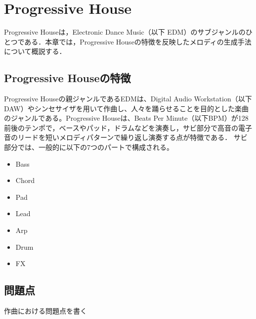 \chapter{Progressive House}
Progressive Houseは，Electronic Dance Music（以下 EDM）のサブジャンルのひとつである．本章では，Progressive Houseの特徴を反映したメロディの生成手法について概説する．

\section{Progressive Houseの特徴}
Progressive Houseの親ジャンルであるEDMは、Digital Audio Workstation（以下 DAW）やシンセサイザを用いて作曲し、人々を踊らせることを目的とした楽曲のジャンルである。Progressive Houseは、Beats Per Minute（以下BPM）が128前後のテンポで，ベースやパッド，ドラムなどを演奏し，サビ部分で高音の電子音のリードを短いメロディパターンで繰り返し演奏する点が特徴である．
サビ部分では、一般的に以下の7つのパートで構成される。
\begin{itemize}
  \item Bass
  \item Chord
  \item Pad
  \item Lead
  \item Arp
  \item Drum
  \item FX
\end{itemize}

\section{問題点}
作曲における問題点を書く

